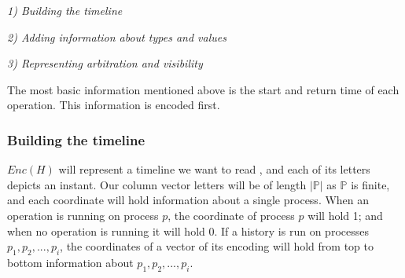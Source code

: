 \documentclass[12pt]{article}
\begin{document}
\textsl{{1) Building the timeline}}

\textsl{{2) Adding information about types and values}}

\textsl{{3) Representing arbitration and visibility}}

\vspace{1em}
\noindent The most basic information mentioned above is the start and return time of each operation. This information is encoded first.


\vspace{1em}
\subsubsection{Building the timeline}


$Enc(H)$ will represent a timeline we want to read , and each of its letters depicts an instant. Our column vector letters will be of length $|\mathbb{P}|$ as $\mathbb{P}$ is finite, and each coordinate will hold information about a single process. When an operation is running on process $p$, the coordinate of process $p$ will hold 1; and when no operation is running it will hold 0. If a history is run on processes $p_1,p_2,...,p_i$, the coordinates of a vector of its encoding will hold from top to bottom information about $p_1,p_2,...,p_i$.
\end{document}
